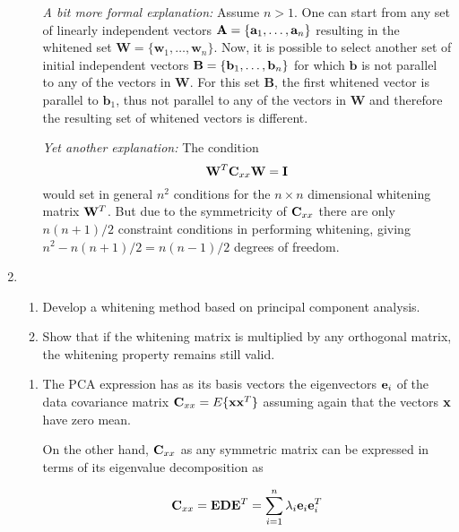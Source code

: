 \begin{enumerate}
\begin{solution}
\begin{enumerate}
      \emph{A bit more formal explanation:} Assume $n>1$.  One can
      start from any set of linearly independent vectors
      $\mathbf{A}=\{\mathbf{a}_1, \ldots, \mathbf{a}_n\}$ resulting in the
      whitened set $\mathbf{W}=\{\mathbf{w}_1, \ldots,
      \mathbf{w}_n\}$.  Now, it is possible to select another set of
      initial independent vectors $\mathbf{B}=\{\mathbf{b}_1, \ldots,
      \mathbf{b}_n\}$ for which $\mathbf{b}$ is not parallel to any of
      the vectors in $\mathbf{W}$.  For this set $\mathbf{B}$, the
      first whitened vector is parallel to $\mathbf{b}_1$, thus not
      parallel to any of the vectors in $\mathbf{W}$ and therefore the
      resulting set of whitened vectors is different. 

      \emph{Yet another explanation:} The condition
      \[
      \mathbf{W}^T\mathbf{C}_{xx}\mathbf{W}=\mathbf{I}
      \]
      would set in general $n^2$ conditions for the $n\times n$ dimensional whitening
      matrix $\mathbf{W}^T$. But due to the symmetricity of $\mathbf{C}_{xx}$ there are
      only $n(n+1)/2$ constraint conditions in performing whitening, giving
      $n^2-n(n+1)/2=n(n-1)/2$ degrees of freedom.

    \end{enumerate}
  \end{solution}


\item
  \begin{enumerate}
  \item Develop a whitening method based on principal component
    analysis.
  \item Show that if the whitening matrix is multiplied by any
    orthogonal matrix, the whitening property remains still valid.
  \end{enumerate}
  
  \begin{solution}

    \begin{enumerate}

    \item The PCA expression has as its basis vectors the eigenvectors
      $\mathbf{e}_i$ of the data covariance matrix
      $\mathbf{C}_{xx}=E\lbrace \mathbf{x}\mathbf{x}^T\rbrace$ assuming
      again that the vectors $\mathbf{x}$ have zero mean.

      On the other hand, $\mathbf{C}_{xx}$ as any symmetric matrix can be expressed
      in terms of its eigenvalue decomposition as

      \[
      \mathbf{C}_{xx} = \mathbf{E}\mathbf{D}\mathbf{E}^T = \sum_{i=1}^{n} \lambda_i \mathbf{e}_i \mathbf{e}_i^T
      \]


\end{enumerate}
\end{solution}
\end{enumerate}

